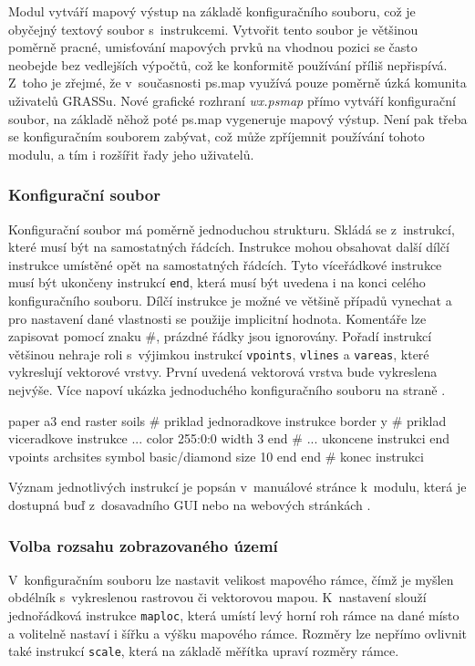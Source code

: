 \documentclass[a4paper,12pt,draft]{article}
\newif\ifbc %
\newcommand{\instr}[1]{\lstinline[style=psmapInline]|#1|}
\begin{document}
\ifbc Jak již bylo zmíněno v~části \ref{sec:porovnani:psmap}, m\else M\fi odul
vytváří
mapový výstup na základě konfiguračního souboru, což je oby\-čejný
textový soubor s~instrukcemi. Vytvořit tento soubor je většinou poměrně
pracné, umisťování mapových prvků na vhodnou pozici se často neobejde
bez vedlejších výpočtů, což ke konformitě používání příliš
nepřispívá. Z~toho je zřejmé, že v~součas\-nosti ps.map využívá
pouze poměrně úzká komunita uživatelů GRASSu. Nové grafické rozhraní
\emph{wx.psmap} přímo vytváří konfigurační soubor, na základě
něhož poté ps.map vygeneruje mapový výstup. Není pak třeba
se konfiguračním souborem zabývat, což může zpříjemnit používání
tohoto modulu, a tím i rozšířit řady jeho uživatelů.

\subsubsection{Konfigurační soubor}
Konfigurační soubor má poměrně jednoduchou strukturu. Skládá se
z~instrukcí, které musí být na samostatných řádcích. Instrukce mohou
obsahovat další dílčí instrukce umístěné opět na samostatných
řádcích. Tyto víceřádkové instrukce musí být ukončeny  instrukcí
\instr{end}, která musí být uvedena i na konci celého konfiguračního
souboru. Dílčí instrukce je možné ve většině případů vynechat a
pro nastavení dané vlastnosti se použije implicitní hodnota. Komentáře
lze zapisovat pomocí znaku \#, prázdné řádky jsou ignorovány. Pořadí
instrukcí většinou nehraje roli s~výjimkou instrukcí \instr{vpoints},
\instr{vlines} a \instr{vareas}, které vykreslují vektorové vrstvy. První
uvedená vektorová vrstva bude vykreslena nejvýše. Více napoví ukázka
jednoduchého konfiguračního souboru na straně \pageref{konfig}.
\begin{psmap}[float=h, title=Příklad jednoduchého konfiguračního souboru,
label=konfig]
paper a3
end
raster soils            # priklad jednoradkove instrukce
border y                # priklad viceradkove instrukce ...
   color 255:0:0
   width 3
end                     # ... ukoncene instrukci end
vpoints archsites
   symbol basic/diamond
   size 10
end
end                     # konec instrukci
\end{psmap}

Význam jednotlivých instrukcí je popsán v~manuálové stránce k~modulu,
která je dostupná buď z~dosavadního GUI nebo na webových stránkách
\cite{manual}.

\subsubsection{Volba rozsahu zobrazovaného území}
\label{sec:psmap:rozsah}
V~konfiguračním souboru lze nastavit velikost mapového rámce, čímž je
myšlen obdélník s~vykreslenou rastrovou či vektorovou mapou.  K~nastavení
slouží jedno\-řádková instrukce \instr{maploc}, která umístí levý
horní roh rámce na dané místo a volitelně nastaví i šířku a
výšku mapového rámce. Rozměry lze nepřímo ovlivnit také instrukcí
\instr{scale}, která na základě měřítka upraví rozměry rámce.
\end{document}
